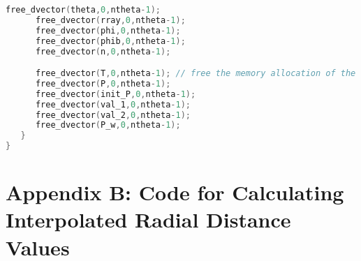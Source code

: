 \documentclass{article}
\begin{document}
\begin{footnotesize}
\begin{lstlisting}[language=c,showstringspaces=false]
      free_dvector(theta,0,ntheta-1);
      free_dvector(rray,0,ntheta-1);
      free_dvector(phi,0,ntheta-1);
      free_dvector(phib,0,ntheta-1);
      free_dvector(n,0,ntheta-1);

      free_dvector(T,0,ntheta-1); // free the memory allocation of the T vector
      free_dvector(P,0,ntheta-1);
      free_dvector(init_P,0,ntheta-1);
      free_dvector(val_1,0,ntheta-1); 
      free_dvector(val_2,0,ntheta-1);
      free_dvector(P_w,0,ntheta-1);
   }
}

\end{lstlisting}
\end{footnotesize}

\newpage
\section*{Appendix B: Code for Calculating Interpolated Radial Distance Values}
\label{app:appendix_B}
\end{document}

